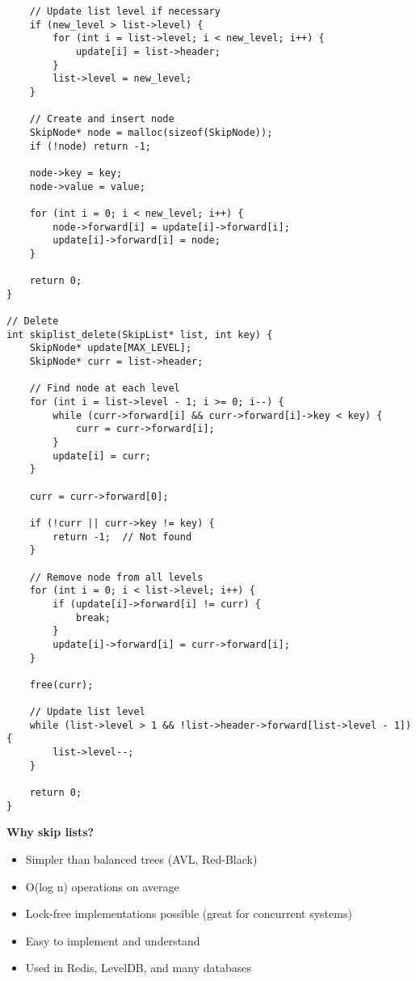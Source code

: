 \begin{lstlisting}
    // Update list level if necessary
    if (new_level > list->level) {
        for (int i = list->level; i < new_level; i++) {
            update[i] = list->header;
        }
        list->level = new_level;
    }

    // Create and insert node
    SkipNode* node = malloc(sizeof(SkipNode));
    if (!node) return -1;

    node->key = key;
    node->value = value;

    for (int i = 0; i < new_level; i++) {
        node->forward[i] = update[i]->forward[i];
        update[i]->forward[i] = node;
    }

    return 0;
}

// Delete
int skiplist_delete(SkipList* list, int key) {
    SkipNode* update[MAX_LEVEL];
    SkipNode* curr = list->header;

    // Find node at each level
    for (int i = list->level - 1; i >= 0; i--) {
        while (curr->forward[i] && curr->forward[i]->key < key) {
            curr = curr->forward[i];
        }
        update[i] = curr;
    }

    curr = curr->forward[0];

    if (!curr || curr->key != key) {
        return -1;  // Not found
    }

    // Remove node from all levels
    for (int i = 0; i < list->level; i++) {
        if (update[i]->forward[i] != curr) {
            break;
        }
        update[i]->forward[i] = curr->forward[i];
    }

    free(curr);

    // Update list level
    while (list->level > 1 && !list->header->forward[list->level - 1]) {
        list->level--;
    }

    return 0;
}
\end{lstlisting}

\textbf{Why skip lists?}

\begin{itemize}
    \item Simpler than balanced trees (AVL, Red-Black)
    \item O(log n) operations on average
    \item Lock-free implementations possible (great for concurrent systems)
    \item Easy to implement and understand
    \item Used in Redis, LevelDB, and many databases
\end{itemize}

